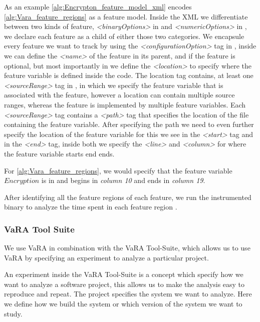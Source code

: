 As an example \autoref{alg:Encrypton_feature_model_xml} encodes \autoref{alg:Vara_feature_regions} as a feature model. 
Inside the \textsc{XML} we differentiate between two kinds of feature, \emph{<binaryOptions>} in  and \emph{<numericOptions>} in 
, we declare each feature as a child of either those two categories. We encapsule every feature we want to 
track by using the \emph{<configurationOption>} tag in , inside we can define the \emph{<name>} of the feature in 
its parent, and if the feature is optional, but most importantly in  we define the \emph{<location>} to specify
where the feature variable is defined inside the code.
The location tag contains, at least one \emph{<sourceRange>} tag in , in which we specify the feature variable that is associated with the feature, 
however a location can contain multiple source ranges, whereas the feature is implemented by multiple feature variables.
Each \emph{<sourceRange>} tag contains a \emph{<path>} tag that specifies the location of the file containing the feature variable.
After specifying the path we need to even further specify the location of the feature variable for this we see in  the \emph{<start>} 
tag and in  the \emph{<end>} tag, inside both we specify the \emph{<line>} and \emph{<column>} for where the feature variable
starts end ends. 

For \autoref{alg:Vara_feature_regions}, we would specify that the feature variable
$Encryption$ is in  and begins in \emph{column 10} and ends in \emph{column 19}.

After identifying all the feature regions of each feature, we run the instrumented binary to analyze the time 
spent in each feature region \cite{VaRA-Flo}.


\subsubsection{VaRA Tool Suite}
We use VaRA in combination with the VaRA Tool-Suite, which allows us to use VaRA by specifying an experiment to analyze a particular project. 

An experiment inside the VaRA Tool-Suite is a concept which specify how we want to analyze a software project, this allows us to make the analysis
easy to reproduce and repeat.
The project specifies the system we want to analyze. Here we define how we build the system or which version of the system we want to study. 

